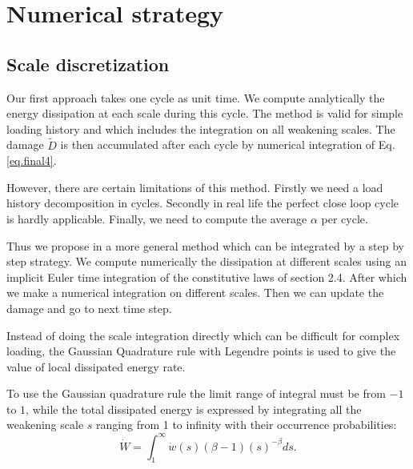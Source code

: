 \newpage
\section{Numerical strategy}
\label{sec:5.7}
\subsection{Scale discretization}
Our first approach takes one cycle as unit time. We compute analytically the energy dissipation at each scale during this cycle. The method is valid for simple loading history and which includes the integration on all weakening scales. The damage $\tilde{D}$ is then accumulated after each cycle by numerical integration of Eq.\eqref{eq.final4}.

However, there are certain limitations of this method. Firstly we need a load history decomposition in cycles. Secondly in real life the perfect close loop cycle is hardly applicable. Finally, we need to compute the average $\alpha$ per cycle.

Thus we propose in a more general method which can be integrated by a step by step strategy. We compute numerically the dissipation at different scales using an implicit Euler time integration of the constitutive laws of section 2.4. After which we make a numerical integration on different scales. Then we can update the damage and go to next time step. 

Instead of doing the scale integration directly which can be difficult for complex loading, the Gaussian Quadrature rule with Legendre points is used to give the value of local dissipated energy rate.

To use the Gaussian quadrature rule the limit range of integral must be from $-1$ to $1$, while the total dissipated energy  is expressed by integrating all the weakening scale $s$ ranging from 1 to infinity with their occurrence probabilities:
$$\dot{W}=\int_{1}^{\infty}\dot{w}(s) (\beta-1)(s)^{-\beta}ds.$$

